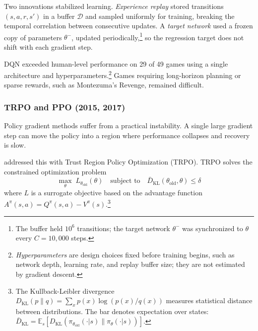Two innovations stabilized learning. \textit{Experience replay} \citep{Lin1992} stored transitions $(s, a, r, s')$ in a buffer $\mathcal{D}$ and sampled uniformly for training, breaking the temporal correlation between consecutive updates. A \textit{target network} used a frozen copy of parameters $\theta^-$, updated periodically,\footnote{The buffer held $10^6$ transitions; the target network $\theta^-$ was synchronized to $\theta$ every $C = 10{,}000$ steps.} so the regression target does not shift with each gradient step.


DQN exceeded human-level performance on 29 of 49 games using a single architecture and hyperparameters.\footnote{\emph{Hyperparameters} are design choices fixed before training begins, such as network depth, learning rate, and replay buffer size; they are not estimated by gradient descent.} Games requiring long-horizon planning or sparse rewards, such as Montezuma's Revenge, remained difficult.

\subsubsection{TRPO and PPO (2015, 2017)}

Policy gradient methods suffer from a practical instability. A single large gradient step can move the policy into a region where performance collapses and recovery is slow.

\citet{Schulman2015} addressed this with Trust Region Policy Optimization (TRPO). TRPO solves the constrained optimization problem
\begin{equation}
\max_\theta \; L_{\theta_{\text{old}}}(\theta) \quad \text{subject to} \quad \bar{D}_{\mathrm{KL}}(\theta_{\text{old}}, \theta) \leq \delta
\end{equation}
where $L$ is a surrogate objective based on the advantage function $A^\pi(s,a) = Q^\pi(s,a) - V^\pi(s)$.\footnote{The Kullback-Leibler divergence $D_{\mathrm{KL}}(p \| q) = \sum_x p(x) \log(p(x)/q(x))$ measures statistical distance between distributions. The bar denotes expectation over states: $\bar{D}_{\mathrm{KL}} = \mathbb{E}_{s}[D_{\mathrm{KL}}(\pi_{\theta_{\text{old}}}(\cdot|s) \| \pi_\theta(\cdot|s))]$.}

